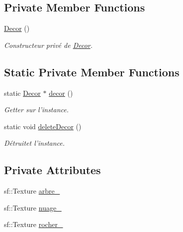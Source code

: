 \subsection*{Private Member Functions}
\begin{DoxyCompactItemize}
\item 
\hypertarget{classPropriete_1_1Decor_a6980dec8b633096c1a5420fd80855e3e}{\hyperlink{classPropriete_1_1Decor_a6980dec8b633096c1a5420fd80855e3e}{Decor} ()}\label{classPropriete_1_1Decor_a6980dec8b633096c1a5420fd80855e3e}

\begin{DoxyCompactList}\small\item\em Constructeur privé de \hyperlink{classPropriete_1_1Decor}{Decor}. \end{DoxyCompactList}\end{DoxyCompactItemize}
\subsection*{Static Private Member Functions}
\begin{DoxyCompactItemize}
\item 
\hypertarget{classPropriete_1_1Decor_a5e5568553b7c154905919483885dcf0e}{static \hyperlink{classPropriete_1_1Decor}{Decor} $\ast$ \hyperlink{classPropriete_1_1Decor_a5e5568553b7c154905919483885dcf0e}{decor} ()}\label{classPropriete_1_1Decor_a5e5568553b7c154905919483885dcf0e}

\begin{DoxyCompactList}\small\item\em Getter sur l'instance. \end{DoxyCompactList}\item 
\hypertarget{classPropriete_1_1Decor_a3503a73ec1ce2f4534fd246a41a619a1}{static void \hyperlink{classPropriete_1_1Decor_a3503a73ec1ce2f4534fd246a41a619a1}{delete\-Decor} ()}\label{classPropriete_1_1Decor_a3503a73ec1ce2f4534fd246a41a619a1}

\begin{DoxyCompactList}\small\item\em Détruitet l'instance. \end{DoxyCompactList}\end{DoxyCompactItemize}
\subsection*{Private Attributes}
\begin{DoxyCompactItemize}
\item 
sf\-::\-Texture \hyperlink{classPropriete_1_1Decor_a0caebcbb0786093a5b670e43e5a47bfa}{arbre\-\_\-}
\item 
sf\-::\-Texture \hyperlink{classPropriete_1_1Decor_aaf696e43073691f2d5bd9d6cd76c0b23}{nuage\-\_\-}
\item 
sf\-::\-Texture \hyperlink{classPropriete_1_1Decor_a521c46f8d6af9e7a5ba0d579d412f326}{rocher\-\_\-}
\end{DoxyCompactItemize}
